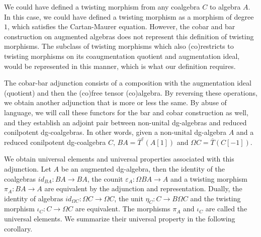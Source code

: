 \documentclass[../thesis.tex]{subfiles}
\begin{document}
            \begin{remark}
                We could have defined a twisting morphism from any coalgebra $C$ to algebra $A$. In this case, we could have defined a twisting morphism as a morphism of degree $1$, which satisfies the Cartan-Maurer equation. However, the cobar and bar construction on augmented algebras does not represent this definition of twisting morphisms. The subclass of twisting morphisms which also (co)restricts to twisting morphisms on its coaugmentation quotient and augmentation ideal, would be represented in this manner, which is what our definition requires. 

                The cobar-bar adjunction consists of a composition with the augmentation ideal (quotient) and then the (co)free tensor (co)algebra. By reversing these operations, we obtain another adjunction that is more or less the same. By abuse of language, we will call these functors for the bar and cobar construction as well, and they establish an adjoint pair between non-unital dg-algebras and reduced conilpotent dg-coalgebras. In other words, given a non-unital dg-algebra $A$ and a reduced conilpotent dg-coalgebra $C$, $BA = \overline{T}^c(A[1])$ and $\Omega C = \overline{T}(C[-1])$.
                \begin{center}
                \end{center}
            \end{remark}

            We obtain universal elements and universal properties associated with this adjunction. Let $A$ be an augmented dg-algebra, then the identity of the coalgebras $id_{BA}: BA \rightarrow BA$, the counit $\varepsilon_A: \Omega BA \rightarrow A$ and a twisting morphism $\pi_A: BA \rightarrow A$ are equivalent by the adjunction and representation. Dually, the identity of algebras $id_{\Omega C} : \Omega C\rightarrow\Omega C$, the unit $\eta_C : C \rightarrow B\Omega C$ and the twisting morphism $\iota_C : C\rightarrow \Omega C$ are equivalent. The morphisms $\pi_A$ and $\iota_C$ are called the universal elements. We summarize their universal property in the following corollary.
\end{document}
